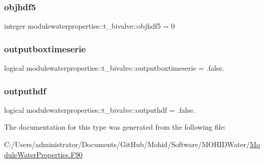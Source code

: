\subsubsection{\texorpdfstring{objhdf5}{objhdf5}}
{\footnotesize\ttfamily integer modulewaterproperties\+::t\+\_\+bivalve\+::objhdf5 = 0\hspace{0.3cm}{\ttfamily [private]}}

\mbox{\label{structmodulewaterproperties_1_1t__bivalve_a814ce03a6920f9fe63a022d0f7cfaabb}} 
\subsubsection{\texorpdfstring{outputboxtimeserie}{outputboxtimeserie}}
{\footnotesize\ttfamily logical modulewaterproperties\+::t\+\_\+bivalve\+::outputboxtimeserie = .false.\hspace{0.3cm}{\ttfamily [private]}}

\mbox{\label{structmodulewaterproperties_1_1t__bivalve_a45597b29897557940a55026e15f9efe8}} 
\subsubsection{\texorpdfstring{outputhdf}{outputhdf}}
{\footnotesize\ttfamily logical modulewaterproperties\+::t\+\_\+bivalve\+::outputhdf = .false.\hspace{0.3cm}{\ttfamily [private]}}



The documentation for this type was generated from the following file\+:\begin{DoxyCompactItemize}
\item 
C\+:/\+Users/administrator/\+Documents/\+Git\+Hub/\+Mohid/\+Software/\+M\+O\+H\+I\+D\+Water/\mbox{\hyperlink{_module_water_properties_8_f90}{Module\+Water\+Properties.\+F90}}\end{DoxyCompactItemize}
